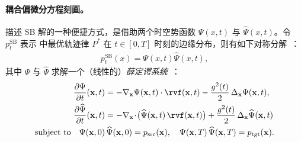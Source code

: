 \paragraph{耦合偏微分方程刻画。}
描述 SB 解的一种便捷方式，是借助两个时空势函数 $\Psi(x,t)$ 与 $\widehat{\Psi}(x,t)$。令
$p_t^{\mathrm{SB}}$ 表示  中最优轨迹律 $P^*$ 在 $t\in[0,T]$ 时刻的边缘分布，则有如下对称分解~\citep{dai1991stochastic}：
\begin{align}\label{eq:sb-symmetry}
p_t^{\mathrm{SB}}(x) = \Psi(x,t) \widehat{\Psi}(x,t),
\end{align}
其中 $\Psi$ 与 $\widehat{\Psi}$ 求解一个（线性的）\emph{薛定谔系统}~\citep{caluya2021wasserstein,chen2021stochastic,chenlikelihood}：
\begin{align}
\begin{aligned}\label{eq:pde-schrodinger}
\frac{\partial \Psi}{\partial t}(\mathbf{x},t)
  &= -\nabla_{\mathbf{x}} \Psi(\mathbf{x},t) \cdot \rvf(\mathbf{x},t)
     - \frac{g^2(t)}{2}\,\Delta_\mathbf{x} \Psi(\mathbf{x},t),  \\
\frac{\partial \widehat{\Psi}}{\partial t}(\mathbf{x},t)
  &= -\nabla_{\mathbf{x}}\!\cdot\!\bigl(\widehat{\Psi}(\mathbf{x},t)\,\rvf(\mathbf{x},t)\bigr)
     + \frac{g^2(t)}{2}\,\Delta_\mathbf{x}\widehat{\Psi}(\mathbf{x},t)
\\ \text{subject to}\quad
\Psi(\mathbf{x},0)&\,\widehat{\Psi}(\mathbf{x},0) = p_{\mathrm{src}}(\mathbf{x}),
\quad
\Psi(\mathbf{x},T)\,\widehat{\Psi}(\mathbf{x},T) = p_{\mathrm{tgt}}(\mathbf{x}).
\end{aligned}
\end{align}

